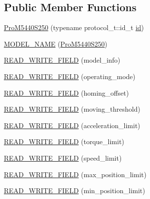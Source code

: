 \subsection*{Public Member Functions}
\begin{DoxyCompactItemize}
\item 
\hyperlink{classdynamixel_1_1servos_1_1_pro_m5440_s250_a9a68d1f3bef7fdd4fdfdb9530173c8bf}{Pro\+M5440\+S250} (typename protocol\+\_\+t\+::id\+\_\+t \hyperlink{classdynamixel_1_1servos_1_1_servo_a2d022081672e25a7bb57b76706e1cc57}{id})
\item 
\hyperlink{classdynamixel_1_1servos_1_1_pro_m5440_s250_a9cae65a7928935b4eb0cde4677eee289}{M\+O\+D\+E\+L\+\_\+\+N\+A\+M\+E} (\hyperlink{classdynamixel_1_1servos_1_1_pro_m5440_s250}{Pro\+M5440\+S250})
\item 
\hyperlink{classdynamixel_1_1servos_1_1_pro_m5440_s250_a16df9221b5d7c815ff0e4fb9b452ae09}{R\+E\+A\+D\+\_\+\+W\+R\+I\+T\+E\+\_\+\+F\+I\+E\+L\+D} (model\+\_\+info)
\item 
\hyperlink{classdynamixel_1_1servos_1_1_pro_m5440_s250_a1d9d9bdf804734f5b137be2871931d79}{R\+E\+A\+D\+\_\+\+W\+R\+I\+T\+E\+\_\+\+F\+I\+E\+L\+D} (operating\+\_\+mode)
\item 
\hyperlink{classdynamixel_1_1servos_1_1_pro_m5440_s250_a4ad29677d4e3bc7be07f2550e24a4360}{R\+E\+A\+D\+\_\+\+W\+R\+I\+T\+E\+\_\+\+F\+I\+E\+L\+D} (homing\+\_\+offset)
\item 
\hyperlink{classdynamixel_1_1servos_1_1_pro_m5440_s250_a2221ec6f843818ff7f7065e32971c9f9}{R\+E\+A\+D\+\_\+\+W\+R\+I\+T\+E\+\_\+\+F\+I\+E\+L\+D} (moving\+\_\+threshold)
\item 
\hyperlink{classdynamixel_1_1servos_1_1_pro_m5440_s250_a2b5c5504cc36c260b794c673b02e5842}{R\+E\+A\+D\+\_\+\+W\+R\+I\+T\+E\+\_\+\+F\+I\+E\+L\+D} (acceleration\+\_\+limit)
\item 
\hyperlink{classdynamixel_1_1servos_1_1_pro_m5440_s250_ac0bb0bba9cd94c6906a09cd53db898ec}{R\+E\+A\+D\+\_\+\+W\+R\+I\+T\+E\+\_\+\+F\+I\+E\+L\+D} (torque\+\_\+limit)
\item 
\hyperlink{classdynamixel_1_1servos_1_1_pro_m5440_s250_a047bc6b2923290b33e6283b620300087}{R\+E\+A\+D\+\_\+\+W\+R\+I\+T\+E\+\_\+\+F\+I\+E\+L\+D} (speed\+\_\+limit)
\item 
\hyperlink{classdynamixel_1_1servos_1_1_pro_m5440_s250_a1751f66974b39913971d3f1977a31bf0}{R\+E\+A\+D\+\_\+\+W\+R\+I\+T\+E\+\_\+\+F\+I\+E\+L\+D} (max\+\_\+position\+\_\+limit)
\item 
\hyperlink{classdynamixel_1_1servos_1_1_pro_m5440_s250_abdc9a5026f9a17741ac3a5870e263c91}{R\+E\+A\+D\+\_\+\+W\+R\+I\+T\+E\+\_\+\+F\+I\+E\+L\+D} (min\+\_\+position\+\_\+limit)

\end{DoxyCompactItemize}
